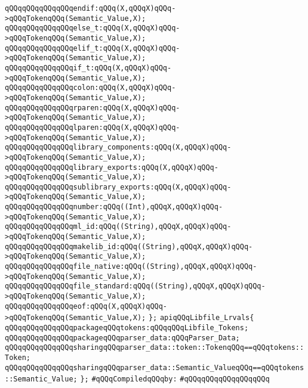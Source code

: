\verb|qQQqqQQqqQQqqQQqendif:qQQq(X,qQQqX)qQQq->qQQqTokenqQQq(Semantic_Value,X);|\newline
\verb|qQQqqQQqqQQqqQQqelse_t:qQQq(X,qQQqX)qQQq->qQQqTokenqQQq(Semantic_Value,X);|\newline
\verb|qQQqqQQqqQQqqQQqelif_t:qQQq(X,qQQqX)qQQq->qQQqTokenqQQq(Semantic_Value,X);|\newline
\verb|qQQqqQQqqQQqqQQqif_t:qQQq(X,qQQqX)qQQq->qQQqTokenqQQq(Semantic_Value,X);|\newline
\verb|qQQqqQQqqQQqqQQqcolon:qQQq(X,qQQqX)qQQq->qQQqTokenqQQq(Semantic_Value,X);|\newline
\verb|qQQqqQQqqQQqqQQqrparen:qQQq(X,qQQqX)qQQq->qQQqTokenqQQq(Semantic_Value,X);|\newline
\verb|qQQqqQQqqQQqqQQqlparen:qQQq(X,qQQqX)qQQq->qQQqTokenqQQq(Semantic_Value,X);|\newline
\verb|qQQqqQQqqQQqqQQqlibrary_components:qQQq(X,qQQqX)qQQq->qQQqTokenqQQq(Semantic_Value,X);|\newline
\verb|qQQqqQQqqQQqqQQqlibrary_exports:qQQq(X,qQQqX)qQQq->qQQqTokenqQQq(Semantic_Value,X);|\newline
\verb|qQQqqQQqqQQqqQQqsublibrary_exports:qQQq(X,qQQqX)qQQq->qQQqTokenqQQq(Semantic_Value,X);|\newline
\verb|qQQqqQQqqQQqqQQqnumber:qQQq((Int),qQQqX,qQQqX)qQQq->qQQqTokenqQQq(Semantic_Value,X);|\newline
\verb|qQQqqQQqqQQqqQQqml_id:qQQq((String),qQQqX,qQQqX)qQQq->qQQqTokenqQQq(Semantic_Value,X);|\newline
\verb|qQQqqQQqqQQqqQQqmakelib_id:qQQq((String),qQQqX,qQQqX)qQQq->qQQqTokenqQQq(Semantic_Value,X);|\newline
\verb|qQQqqQQqqQQqqQQqfile_native:qQQq((String),qQQqX,qQQqX)qQQq->qQQqTokenqQQq(Semantic_Value,X);|\newline
\verb|qQQqqQQqqQQqqQQqfile_standard:qQQq((String),qQQqX,qQQqX)qQQq->qQQqTokenqQQq(Semantic_Value,X);|\newline
\verb|qQQqqQQqqQQqqQQqeof:qQQq(X,qQQqX)qQQq->qQQqTokenqQQq(Semantic_Value,X);|\newline
\verb|};|\newline
\verb|apiqQQqLibfile_Lrvals{|\newline
\verb|qQQqqQQqqQQqqQQqpackageqQQqtokens:qQQqqQQqLibfile_Tokens;|\newline
\verb|qQQqqQQqqQQqqQQqpackageqQQqparser_data:qQQqParser_Data;|\newline
\verb|qQQqqQQqqQQqqQQqsharingqQQqparser_data::token::TokenqQQq==qQQqtokens::Token;|\newline
\verb|qQQqqQQqqQQqqQQqsharingqQQqparser_data::Semantic_ValueqQQq==qQQqtokens::Semantic_Value;|\newline
\verb|};|\newline
\newline
\verb|#qQQqCompiledqQQqby:|\newline
\verb|#qQQqqQQqqQQqqQQqqQQq|\newline
\newline

